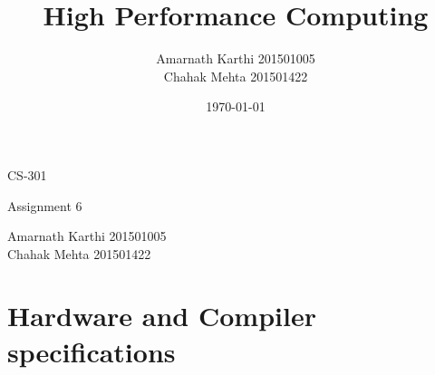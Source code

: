 \documentclass[12,a4paper]{article}
\title{High Performance Computing}
\date{\today}
\author{Amarnath Karthi  201501005 \\ Chahak Mehta  201501422}
\begin{document}
    \begin{titlepage}
	\centering
	{\scshape\LARGE CS-301 \par}
	\vspace{0.1cm}
	{\huge \@title \par}
	\vspace{0.5cm}
	{\Large Assignment 6\par}
	\vspace{10cm}
	\Large Amarnath Karthi          201501005\\
	\Large Chahak Mehta             201501422\\
	\vspace{5cm}
	{\large \@date\par}
    \end{titlepage}
    
    
    \section{Hardware and Compiler specifications}
    \renewcommand{\arraystretch}{1.5}
\end{document}
